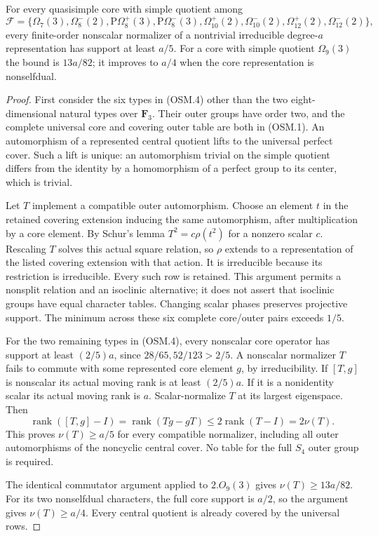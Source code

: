 \begin{lemma}
\label{D-OSM-02}
For every quasisimple core with simple quotient among
\[
\mathcal F=\{\Omega_7(3),\Omega_8^-(2),
 \mathrm{P}\Omega_8^+(3),\mathrm{P}\Omega_8^-(3),
 \Omega_{10}^+(2),\Omega_{10}^-(2),
 \Omega_{12}^+(2),\Omega_{12}^-(2)\},                         \tag{OSM.4}
\]
every finite-order nonscalar normalizer of a nontrivial irreducible
degree-$a$ representation has support at least $a/5$.
For a core with simple quotient $\Omega_9(3)$ the bound is
$13a/82$; it improves to $a/4$ when the core representation is
nonselfdual.
\end{lemma}

\begin{proof}
First consider the six types in (OSM.4) other than the two
eight-dimensional natural types over $\mathbf F_3$.
Their outer groups have order two, and the complete universal core
and covering outer table are both in (OSM.1). An automorphism of a
represented central quotient lifts to the universal perfect cover.
Such a lift is unique: an automorphism trivial on the simple quotient
differs from the identity by a homomorphism of a perfect group to its
center, which is trivial.

Let $T$ implement a compatible outer automorphism. Choose an element
$t$ in the retained covering extension inducing the same automorphism,
after multiplication by a core element. By Schur's lemma
$T^2=c\rho(t^2)$ for a nonzero scalar $c$. Rescaling $T$ solves this
actual square relation, so $\rho$ extends to a representation of the
listed covering extension with that action. It is irreducible because
its restriction is irreducible. Every such row is retained. This
argument permits a nonsplit relation and an isoclinic alternative;
it does not assert that isoclinic groups have equal character tables.
Changing scalar phases preserves projective support.
The minimum across these six complete core/outer pairs exceeds $1/5$.

For the two remaining types in (OSM.4), every nonscalar core operator
has support at least $(2/5)a$, since $28/65,52/123>2/5$.
A nonscalar normalizer $T$ fails to commute with some represented
core element $g$, by irreducibility. If $[T,g]$ is nonscalar its
actual moving rank is at least $(2/5)a$. If it is a nonidentity
scalar its actual moving rank is $a$. Scalar-normalize $T$ at its
largest eigenspace. Then
\[
 \operatorname{rank}([T,g]-I)
 =\operatorname{rank}(Tg-gT)\le2\operatorname{rank}(T-I)
 =2\nu(T).                                                    \tag{OSM.5}
\]
This proves $\nu(T)\ge a/5$ for every compatible normalizer,
including all outer automorphisms of the noncyclic central cover.
No table for the full $S_4$ outer group is required.

The identical commutator argument applied to $2.O_9(3)$ gives
$\nu(T)\ge13a/82$. For its two nonselfdual characters, the full
core support is $a/2$, so the argument gives $\nu(T)\ge a/4$.
Every central quotient is already covered by the universal rows.
\end{proof}

